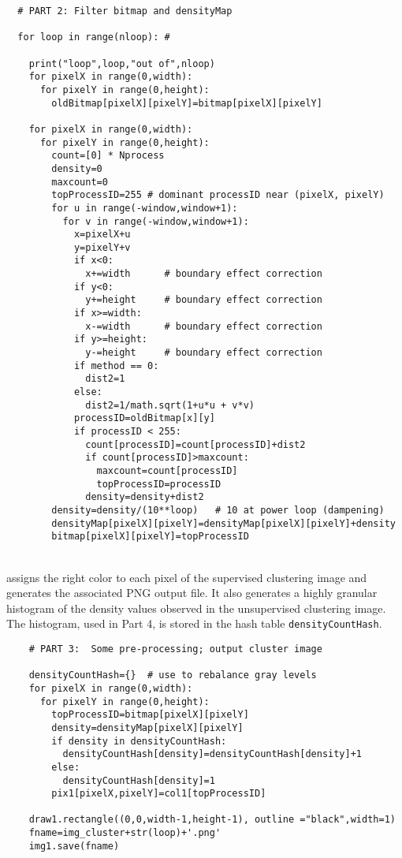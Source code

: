 \documentclass[10pt]{article}
\begin{document}
\begin{lstlisting}
  # PART 2: Filter bitmap and densityMap 

  for loop in range(nloop): #  

    print("loop",loop,"out of",nloop)
    for pixelX in range(0,width): 
      for pixelY in range(0,height): 
        oldBitmap[pixelX][pixelY]=bitmap[pixelX][pixelY]

    for pixelX in range(0,width): 
      for pixelY in range(0,height):   
        count=[0] * Nprocess
        density=0
        maxcount=0
        topProcessID=255 # dominant processID near (pixelX, pixelY)
        for u in range(-window,window+1): 
          for v in range(-window,window+1):
            x=pixelX+u
            y=pixelY+v
            if x<0: 
              x+=width      # boundary effect correction
            if y<0: 
              y+=height     # boundary effect correction
            if x>=width: 
              x-=width      # boundary effect correction
            if y>=height: 
              y-=height     # boundary effect correction
            if method == 0:
              dist2=1
            else: 
              dist2=1/math.sqrt(1+u*u + v*v)
            processID=oldBitmap[x][y]
            if processID < 255: 
              count[processID]=count[processID]+dist2
              if count[processID]>maxcount: 
                maxcount=count[processID]
                topProcessID=processID
              density=density+dist2 
        density=density/(10**loop)   # 10 at power loop (dampening)
        densityMap[pixelX][pixelY]=densityMap[pixelX][pixelY]+density
        bitmap[pixelX][pixelY]=topProcessID
\end{lstlisting}
\quad \\
 assigns the right color to each pixel of the supervised clustering image and generates the associated PNG output file. It also generates a highly granular histogram of the density values observed in the unsupervised clustering image. The histogram, used in Part 4,  is stored in the hash table \texttt{densityCountHash}. 
\begin{lstlisting}
    # PART 3:  Some pre-processing; output cluster image

    densityCountHash={}  # use to rebalance gray levels
    for pixelX in range(0,width): 
      for pixelY in range(0,height):   
        topProcessID=bitmap[pixelX][pixelY]
        density=densityMap[pixelX][pixelY]
        if density in densityCountHash:
          densityCountHash[density]=densityCountHash[density]+1
        else:
          densityCountHash[density]=1
        pix1[pixelX,pixelY]=col1[topProcessID]

    draw1.rectangle((0,0,width-1,height-1), outline ="black",width=1)
    fname=img_cluster+str(loop)+'.png'
    img1.save(fname)
\end{lstlisting}
\end{document}
